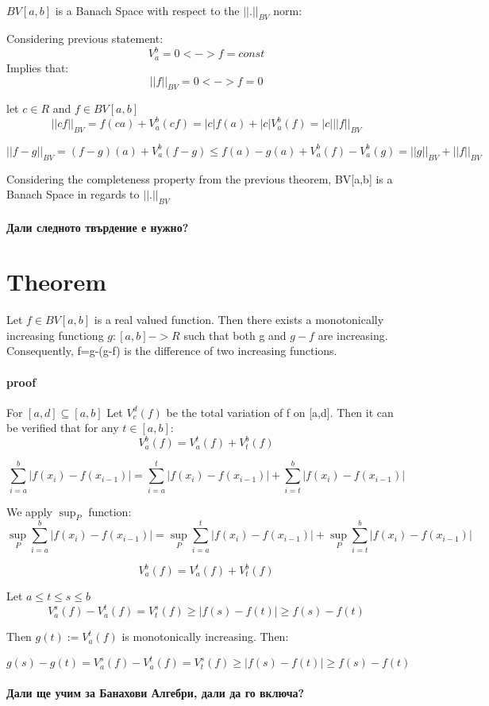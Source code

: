 \documentclass{article}
\begin{document}
\paragraph{} $BV[a,b]$ is a Banach Space with respect to the $||.||_{BV}$ norm:

Considering previous statement:
$$V^b_a=0 <-> f=const$$
Implies that:
$$||f||_{BV}=0<->f=0$$

let $c \in R$ and $f \in BV[a,b]$
$$||cf||_{BV}=f(ca)+V_a^b(cf)=|c|f(a)+|c|V_a^b(f)=|c|||f||_{BV}$$

$$||f-g||_{BV}=(f-g)(a)+V^b_a(f-g) \leq f(a)-g(a)+V^b_a(f)-V^b_a(g)=||g||_{BV}+||f||_{BV}$$


Considering the completeness property from the previous theorem, BV[a,b] is a Banach Space in regards to $||.||_{BV}$

\paragraph{\LARGE Дали следното твърдение е нужно?}

\section{Theorem}
Let $f \in BV[a,b]$ is a real valued function. Then there exists a monotonically increasing functiong $g:[a,b]->R$ such that both g and $g-f$ are increasing. Consequently, f=g-(g-f) is the difference of two increasing functions.

\paragraph{proof}

For $[a, d] \subseteq [a,b]$ Let $V_c^d(f)$ be the total variation of f on [a,d]. Then it can be verified that for any $t \in [a,b]:$
$$V_a^b(f)=V_a^t(f)+V_t^b(f)$$

$$\sum_{i=a}^{b} |f(x_{i})-f(x_{i-1})| = \sum_{i=a}^{t} |f(x_{i})-f(x_{i-1})| + \sum_{i=t}^{b} |f(x_{i})-f(x_{i-1})| $$

We apply $\sup_P$ function: \\
$$\sup_P \sum_{i=a}^{b} |f(x_{i})-f(x_{i-1})| = \sup_P \sum_{i=a}^{t} |f(x_{i})-f(x_{i-1})| + \sup_P \sum_{i=t}^{b} |f(x_{i})-f(x_{i-1})| $$

$$V_a^b(f)=V_a^t(f) + V_t^b(f)$$

Let $ a \leq t \leq s \leq b$
$$V_a^s(f)-V_a^t(f)=V_t^s(f) \geq |f(s)-f(t)| \geq f(s) - f(t)$$

Then $g(t) := V^t_a(f)$ is monotonically increasing. Then:

$$g(s)-g(t)=V^s_a(f)-V^t_a(f)=V_t^s(f) \geq |f(s)-f(t)| \geq f(s)-f(t)$$

\paragraph{\LARGE Дали ще учим за Банахови Алгебри, дали да го включа?}
\end{document}
